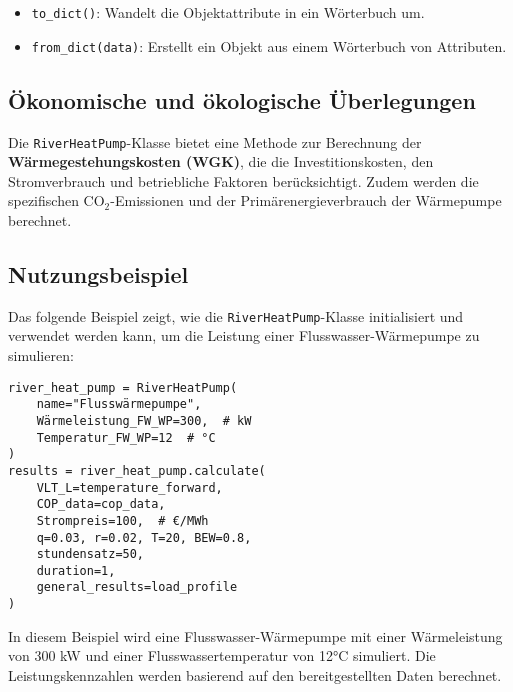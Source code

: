 \begin{itemize}
    \item \texttt{to\_dict()}: Wandelt die Objektattribute in ein Wörterbuch um.

    \item \texttt{from\_dict(data)}: Erstellt ein Objekt aus einem Wörterbuch von Attributen.
\end{itemize}

\subsection{Ökonomische und ökologische Überlegungen}
Die \texttt{RiverHeatPump}-Klasse bietet eine Methode zur Berechnung der \textbf{Wärmegestehungskosten (WGK)}, die die Investitionskosten, den Stromverbrauch und betriebliche Faktoren berücksichtigt. Zudem werden die spezifischen CO$_2$-Emissionen und der Primärenergieverbrauch der Wärmepumpe berechnet.

\subsection{Nutzungsbeispiel}
Das folgende Beispiel zeigt, wie die \texttt{RiverHeatPump}-Klasse initialisiert und verwendet werden kann, um die Leistung einer Flusswasser-Wärmepumpe zu simulieren:

\begin{verbatim}
river_heat_pump = RiverHeatPump(
    name="Flusswärmepumpe", 
    Wärmeleistung_FW_WP=300,  # kW
    Temperatur_FW_WP=12  # °C
)
results = river_heat_pump.calculate(
    VLT_L=temperature_forward, 
    COP_data=cop_data, 
    Strompreis=100,  # €/MWh
    q=0.03, r=0.02, T=20, BEW=0.8, 
    stundensatz=50, 
    duration=1, 
    general_results=load_profile
)
\end{verbatim}
In diesem Beispiel wird eine Flusswasser-Wärmepumpe mit einer Wärmeleistung von 300 kW und einer Flusswassertemperatur von 12°C simuliert. Die Leistungskennzahlen werden basierend auf den bereitgestellten Daten berechnet.

